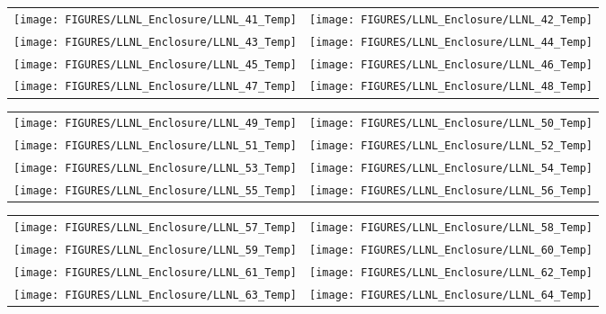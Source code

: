 \begin{figure}[p]
\begin{tabular*}{\textwidth}{l@{\extracolsep{\fill}}r}
\texttt{[image: FIGURES/LLNL\_Enclosure/LLNL\_41\_Temp]} &
\texttt{[image: FIGURES/LLNL\_Enclosure/LLNL\_42\_Temp]} \\
\texttt{[image: FIGURES/LLNL\_Enclosure/LLNL\_43\_Temp]} &
\texttt{[image: FIGURES/LLNL\_Enclosure/LLNL\_44\_Temp]} \\
\texttt{[image: FIGURES/LLNL\_Enclosure/LLNL\_45\_Temp]} &
\texttt{[image: FIGURES/LLNL\_Enclosure/LLNL\_46\_Temp]} \\
\texttt{[image: FIGURES/LLNL\_Enclosure/LLNL\_47\_Temp]} &
\texttt{[image: FIGURES/LLNL\_Enclosure/LLNL\_48\_Temp]}
\end{tabular*}
\label{LLNL_Enclosure_Temp_6}
\end{figure}

\begin{figure}[p]
\begin{tabular*}{\textwidth}{l@{\extracolsep{\fill}}r}
\texttt{[image: FIGURES/LLNL\_Enclosure/LLNL\_49\_Temp]} &
\texttt{[image: FIGURES/LLNL\_Enclosure/LLNL\_50\_Temp]} \\
\texttt{[image: FIGURES/LLNL\_Enclosure/LLNL\_51\_Temp]} &
\texttt{[image: FIGURES/LLNL\_Enclosure/LLNL\_52\_Temp]} \\
\texttt{[image: FIGURES/LLNL\_Enclosure/LLNL\_53\_Temp]} &
\texttt{[image: FIGURES/LLNL\_Enclosure/LLNL\_54\_Temp]} \\
\texttt{[image: FIGURES/LLNL\_Enclosure/LLNL\_55\_Temp]} &
\texttt{[image: FIGURES/LLNL\_Enclosure/LLNL\_56\_Temp]}
\end{tabular*}
\label{LLNL_Enclosure_Temp_7}
\end{figure}

\begin{figure}[p]
\begin{tabular*}{\textwidth}{l@{\extracolsep{\fill}}r}
\texttt{[image: FIGURES/LLNL\_Enclosure/LLNL\_57\_Temp]} &
\texttt{[image: FIGURES/LLNL\_Enclosure/LLNL\_58\_Temp]} \\
\texttt{[image: FIGURES/LLNL\_Enclosure/LLNL\_59\_Temp]} &
\texttt{[image: FIGURES/LLNL\_Enclosure/LLNL\_60\_Temp]} \\
\texttt{[image: FIGURES/LLNL\_Enclosure/LLNL\_61\_Temp]} &
\texttt{[image: FIGURES/LLNL\_Enclosure/LLNL\_62\_Temp]} \\
\texttt{[image: FIGURES/LLNL\_Enclosure/LLNL\_63\_Temp]} &
\texttt{[image: FIGURES/LLNL\_Enclosure/LLNL\_64\_Temp]}
\end{tabular*}
\label{LLNL_Enclosure_Temp_8}
\end{figure}

